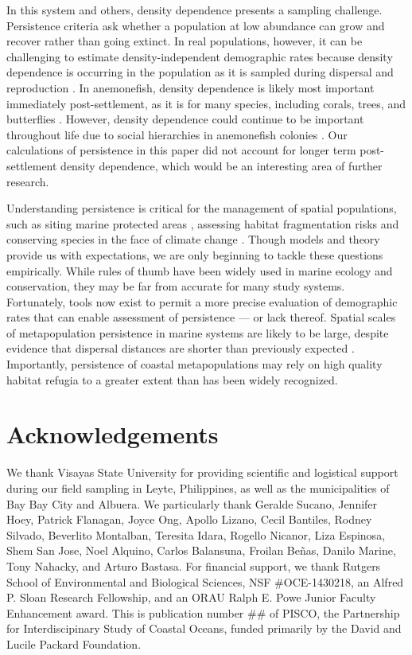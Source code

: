 \documentclass[12pt, oneside]{article}   	%
\begin{document}
In this system and others, density dependence presents a sampling challenge. Persistence criteria \citep{hastings_persistence_2006, burgess2014beyond} ask whether a population at low abundance can grow and recover rather than going extinct. In real populations, however, it can be challenging to estimate density-independent demographic rates because density dependence is occurring in the population as it is sampled during dispersal \citep{nowicki2011evidence} and reproduction \citep{rodenhouse2003multiple}. In anemonefish, density dependence is likely most important immediately post-settlement, as it is for many species, including corals, trees, and butterflies \citep{vermeij2008density, harms2000pervasive, nowicki2009relative}. However, density dependence could continue to be important throughout life due to social hierarchies in anemonefish colonies \citep{buston2011determinants}. Our calculations of persistence in this paper did not account for longer term post-settlement density dependence, which would be an interesting area of further research.

Understanding persistence is critical for the management of spatial populations, such as siting marine protected areas \citep{kaplan_model-based_2009}, assessing habitat fragmentation risks \citep{smith2002population, fahrig2001much} and conserving species in the face of climate change \citep{coleman2017anticipating, fuller2015persistence}. Though models and theory provide us with expectations, we are only beginning to tackle these questions empirically. While rules of thumb have been widely used in marine ecology and conservation, they may be far from accurate for many study systems. Fortunately, tools now exist to permit a more precise evaluation of demographic rates that can enable assessment of persistence --- or lack thereof. Spatial scales of metapopulation persistence in marine systems are likely to be large, despite evidence that dispersal distances are shorter than previously expected \citep{jones1999self, almany2007local}. Importantly, persistence of coastal metapopulations may rely on high quality habitat refugia to a greater extent than has been widely recognized. 

\section*{Acknowledgements}

We thank Visayas State University for providing scientific and logistical support during our field sampling in Leyte, Philippines, as well as the municipalities of Bay Bay City and Albuera. We particularly thank Geralde Sucano, Jennifer Hoey, Patrick Flanagan, Joyce Ong, Apollo Lizano, Cecil Bantiles, Rodney Silvado, Beverlito Montalban, Teresita Idara, Rogello Nicanor, Liza Espinosa, Shem San Jose, Noel Alquino, Carlos Balansuna, Froilan Beñas, Danilo Marine, Tony Nahacky, and Arturo Bastasa. For financial support, we thank Rutgers School of Environmental and Biological Sciences, NSF \#OCE-1430218, an Alfred P. Sloan Research Fellowship, and an ORAU Ralph E. Powe Junior Faculty Enhancement award. This is publication number \#\# of PISCO, the Partnership for Interdiscipinary Study of Coastal Oceans, funded primarily by the David and Lucile Packard Foundation.
\end{document}
